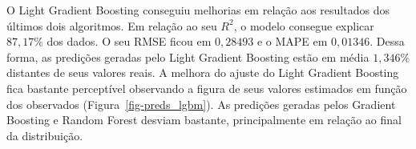 \documentclass[
  12pt,
  a4paper,
]{scrreprt}
\begin{document}
\vspace{12pt}

O Light Gradient Boosting conseguiu melhorias em relação aos resultados
dos últimos dois algoritmos. Em relação ao seu \(R^2\), o modelo
consegue explicar \(87,17\%\) dos dados. O seu RMSE ficou em \(0,28493\)
e o MAPE em \(0,01346\). Dessa forma, as predições geradas pelo Light
Gradient Boosting estão em média \(1,346\%\) distantes de seus valores
reais. A melhora do ajuste do Light Gradient Boosting fica bastante
perceptível observando a figura de seus valores estimados em função dos
observados (Figura~\ref{fig-preds_lgbm}). As predições geradas pelos
Gradient Boosting e Random Forest desviam bastante, principalmente em
relação ao final da distribuição.

\begin{figure}

\begin{minipage}{0.50\linewidth}


\subcaption{\label{fig-preds_lgbm}}

\end{minipage}%
%
\begin{minipage}{0.50\linewidth}

\end{minipage}
\end{figure}
\end{document}
